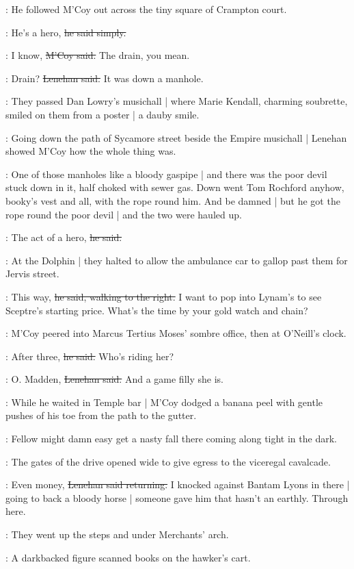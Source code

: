 :
He followed M'Coy out
across the tiny square of Crampton court.

\lenehan:
He's a hero,
\sout{he said simply.}

\mcoy:
I know,
\sout{M'Coy said.}
The drain, you mean.

\lenehan:
Drain?
\sout{Lenehan said.}
It was down a manhole.

:
They passed Dan Lowry's musichall |
where Marie Kendall,
charming soubrette,
smiled on them from a poster |
a dauby smile.

:
Going down the path of Sycamore street
beside the Empire musichall |
Lenehan showed M'Coy how the whole thing was.

\lenehan:
One of those manholes like a bloody gaspipe |
and there was the poor devil stuck down in it,
half choked with sewer gas.
Down went Tom Rochford anyhow,
booky's vest and all,
with the rope round him.
And be damned |
but he got the rope round the poor devil |
and the two were hauled up.

\lenehan:
The act of a hero,
\sout{he said.}

:
At the Dolphin |
they halted to allow the ambulance car
to gallop past them for Jervis street.

\lenehan:
This way,
\sout{he said,
walking to the right.}
I want to pop into Lynam's
to see Sceptre's starting price.
What's the time by your gold watch and chain?

:
M'Coy peered into Marcus Tertius Moses' sombre office,
then at O'Neill's clock.

\mcoy:
After three,
\sout{he said.}
Who's riding her?

\lenehan:
O. Madden,
\sout{Lenehan said.}
And a game filly she is.

:
While he waited in Temple bar |
M'Coy dodged a banana peel
with gentle pushes of his toe
from the path
to the gutter.

\mcoy:
Fellow might damn
easy get a nasty fall there
coming along tight in the dark.

:
The gates of the drive opened wide
to give egress to the viceregal cavalcade.

\lenehan:
Even money,
\sout{Lenehan said returning.}
I knocked against Bantam Lyons in there |
going to back a bloody horse |
someone gave him that hasn't an earthly.
Through here.

:
They went up the steps and under Merchants' arch.

\begin{interject}
    :
    A darkbacked figure scanned books on the hawker's cart.
\end{interject}

